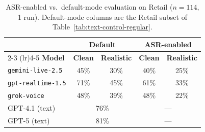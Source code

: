 \begin{table}[h]
\caption{ASR-enabled vs.\ default-mode evaluation on Retail ($n=114$, 1 run). Default-mode columns are the Retail subset of Table~\ref{tab:text-control-regular}.}
\label{tab:asr-enabled}
\centering
\begin{small}
\begin{tabular}{@{}lcccc@{}}
\toprule
 & \multicolumn{2}{c}{\textbf{Default}} & \multicolumn{2}{c}{\textbf{ASR-enabled}} \\
\cmidrule(lr){2-3} \cmidrule(lr){4-5}
\textbf{Model} & \textbf{Clean} & \textbf{Realistic} & \textbf{Clean} & \textbf{Realistic} \\
\midrule
\texttt{gemini-live-2.5} & 45\% & 30\% & 40\% & 25\% \\
\texttt{gpt-realtime-1.5} & 71\% & 45\% & 61\% & 33\% \\
\texttt{grok-voice} & 48\% & 39\% & 48\% & 22\% \\
\midrule
GPT-4.1 (text) & \multicolumn{2}{c}{76\%} & \multicolumn{2}{c}{---} \\
GPT-5 (text) & \multicolumn{2}{c}{81\%} & \multicolumn{2}{c}{---} \\
\bottomrule
\end{tabular}
\end{small}
\end{table}
